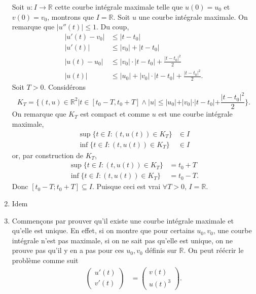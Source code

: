 \documentclass[fontsize=12pt]{article}
\begin{document}
\begin{enumerate}
    Soit $u:I\to\mathbb{R}$ cette courbe intégrale maximale telle que
    $u(0) = u_0$ et $v(0) = v_0$, montrons que $I = \mathbb{R}$.
    Soit $u$ une courbe intégrale maximale.
    On remarque que $|u''(t)| \leq 1$.
    Du coup,
    \begin{align*}
      |u'(t) - v_0| & \leq |t - t_0|\\
      |u'(t)| & \leq |v_0| + |t - t_0|\\
      |u(t) - u_0| & \leq |v_0|\cdot|t - t_0| + \frac{|t - t_0|^2}{2}\\
      |u(t)| & \leq |u_0| + |v_0|\cdot|t - t_0| + \frac{|t - t_0|^2}{2}.
    \end{align*}
    Soit $T > 0$. Considérons
    \[ K_T = \{(t,u) \in \mathbb{R}^2|
    t \in [t_0-T,t_0+T] \land |u| \leq
    |u_0| + |v_0|\cdot|t - t_0| + \frac{|t - t_0|^2}{2}\}. \]
    On remarque que $K_T$ est compact et comme $u$ est une courbe intégrale
    maximale,
    \begin{align*}
      \sup\{t \in I : (t,u(t)) \in K_T\} & \in I\\
      \inf\{t \in I : (t,u(t)) \in K_T\} & \in I
    \end{align*}
    or, par construction de $K_T$,
    \begin{align*}
      \sup\{t \in I : (t,u(t)) \in K_T\} & = t_0 + T\\
      \inf\{t \in I : (t,u(t)) \in K_T\} & = t_0 - T.
    \end{align*}
    Donc $[t_0-T;t_0+T] \subseteq I$.
    Puisque ceci est vrai $\forall T > 0$, $I = \mathbb{R}$.
  \item
    Idem \smiley
  \item
    Commençons par prouver qu'il existe une courbe intégrale maximale
    et qu'elle est unique.
    En effet, si on montre que pour certains $u_0,v_0$, une courbe intégrale
    n'est pas maximale, si on ne sait pas qu'elle est unique,
    on ne prouve pas qu'il y en a pas pour ces $u_0,v_0$
    définis sur $\mathbb{R}$.
    On peut réécrir le problème comme suit
    \begin{align*}
      \begin{pmatrix}
        u'(t)\\
        v'(t)
      \end{pmatrix} & =
      \begin{pmatrix}
        v(t)\\
        u(t)^3
      \end{pmatrix}.
    \end{align*}


\end{enumerate}
\end{document}
